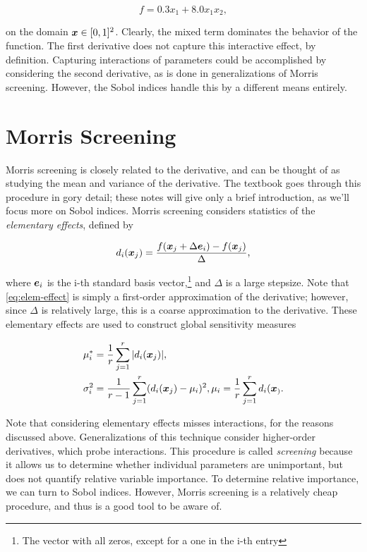 \documentclass[../primer.tex]{subfiles}
\begin{document}
\begin{equation}
  f = 0.3 x_1 + 8.0 x_1 x_2,
\end{equation}

\noindent on the domain \(\boldsymbol{x}\in[0,1]^2\). Clearly, the mixed term dominates the
behavior of the function. The first derivative does not capture this interactive
effect, by definition. Capturing interactions of parameters could be
accomplished by considering the second derivative, as is done in generalizations
of Morris screening. However, the Sobol indices handle this by a different means
entirely.

\section{Morris Screening}
\label{sec:orgf5d704d}
Morris screening is closely related to the derivative, and can be thought of as
studying the mean and variance of the derivative. The textbook
\cite{smith2013uncertainty} goes through this procedure in gory detail; these
notes will give only a brief introduction, as we'll focus more on Sobol indices.
Morris screening considers statistics of the \emph{elementary effects}, defined by

\begin{equation}\label{eq:elem-effect}
  d_{i}(\boldsymbol{x}_j) = \frac{f(\boldsymbol{x}_j+\Delta \boldsymbol{e}_i) - f(\boldsymbol{x}_j)}{\Delta},
\end{equation}

\noindent where \(\boldsymbol{e}_i\) is the i-th standard basis vector,\footnote{The vector with
all zeros, except for a one in the i-th entry} and \(\Delta\) is a large stepsize.
Note that \eqref{eq:elem-effect} is simply a first-order approximation of the
derivative; however, since \(\Delta\) is relatively large, this is a coarse
approximation to the derivative. These elementary effects are used to construct
global sensitivity measures

\begin{equation}\begin{aligned}
  \mu_i^* &= \frac{1}{r}\sum_{j=1}^r |d_{i}(\boldsymbol{x}_j)|, \\
  \sigma_i^2 &= \frac{1}{r-1}\sum_{j=1}^r(d_{i}(\boldsymbol{x}_j)-\mu_i)^2, \mu_i=\frac{1}{r}\sum_{j=1}^rd_{i}(\boldsymbol{x}_).
\end{aligned}\end{equation}

Note that considering elementary effects misses interactions, for the reasons
discussed above. Generalizations of this technique consider higher-order
derivatives, which probe interactions. This procedure is called \emph{screening}
because it allows us to determine whether individual parameters are unimportant,
but does not quantify relative variable importance. To determine relative
importance, we can turn to Sobol indices. However, Morris screening is a
relatively cheap procedure, and thus is a good tool to be aware of.
\end{document}
